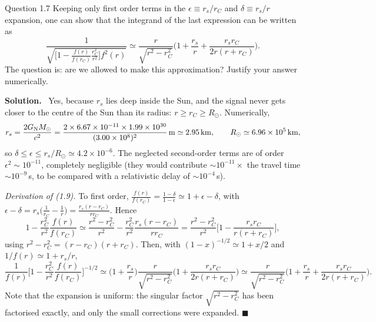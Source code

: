 \documentclass[11pt,a4paper]{article}
\numberwithin{equation}{subsection}
\newenvironment{solution}{\par\noindent\textbf{\textcolor{excol!70!black}{Solution.}}\ }{\hfill$\blacksquare$\par\medskip}
\newcommand{\added}[1]{{\color{teal!60!black}#1}}
\begin{document}
\begin{problem}{Question 1.7}
Keeping only first order terms in the $\epsilon\equiv r_s/r_C$ and $\delta\equiv r_s/r$ expansion, one can show that the integrand of the last expression can be written as
\[
  \frac{1}{\sqrt{\Big[1-\frac{f(r)}{f(r_C)}\frac{r_C^2}{r^2}\Big]f^2(r)}}\simeq\frac{r}{\sqrt{r^2-r_C^2}}\Big(1+\frac{r_s}{r}+\frac{r_sr_C}{2r(r+r_C)}\Big). \tag{1.9}
\]
The question is: are we allowed to make this approximation? Justify your answer numerically.
\end{problem}
\begin{solution}
Yes, because $r_s$ lies deep inside the Sun, and the signal never gets closer to the centre of the Sun than its radius: $r\ge r_C\ge R_\odot$. \added{Numerically,
\[
  r_s=\frac{2G_{\mathrm N} M_\odot}{c^2}=\frac{2\times6.67\times10^{-11}\times1.99\times10^{30}}{(3.00\times10^8)^2}\,\mathrm m\simeq2.95\,\mathrm{km},\qquad R_\odot\simeq6.96\times10^5\,\mathrm{km},
\]
so $\delta\le\epsilon\le r_s/R_\odot\simeq4.2\times10^{-6}$. The neglected second-order terms are of order $\epsilon^2\sim10^{-11}$, completely negligible (they would contribute $\sim10^{-11}\times$ the travel time $\sim10^{-9}$\,s, to be compared with a relativistic delay of $\sim10^{-4}$\,s).}

\added{\textit{Derivation of (1.9).} To first order, $\frac{f(r)}{f(r_C)}=\frac{1-\delta}{1-\epsilon}\simeq1+\epsilon-\delta$, with $\epsilon-\delta=r_s\big(\frac1{r_C}-\frac1r\big)=\frac{r_s(r-r_C)}{rr_C}$. Hence
\[
  1-\frac{r_C^2}{r^2}\frac{f(r)}{f(r_C)}\simeq\frac{r^2-r_C^2}{r^2}-\frac{r_C^2}{r^2}\frac{r_s(r-r_C)}{rr_C}
  =\frac{r^2-r_C^2}{r^2}\Big[1-\frac{r_sr_C}{r(r+r_C)}\Big],
\]
using $r^2-r_C^2=(r-r_C)(r+r_C)$. Then, with $(1-x)^{-1/2}\simeq1+x/2$ and $1/f(r)\simeq1+r_s/r$,
\[
  \frac{1}{f(r)}\Big[1-\frac{r_C^2}{r^2}\frac{f(r)}{f(r_C)}\Big]^{-1/2}\simeq\Big(1+\frac{r_s}{r}\Big)\frac{r}{\sqrt{r^2-r_C^2}}\Big(1+\frac{r_sr_C}{2r(r+r_C)}\Big)
  \simeq\frac{r}{\sqrt{r^2-r_C^2}}\Big(1+\frac{r_s}{r}+\frac{r_sr_C}{2r(r+r_C)}\Big).
\]
Note that the expansion is uniform: the singular factor $\sqrt{r^2-r_C^2}$ has been factorised exactly, and only the small corrections were expanded.}
\end{solution}
\end{document}
